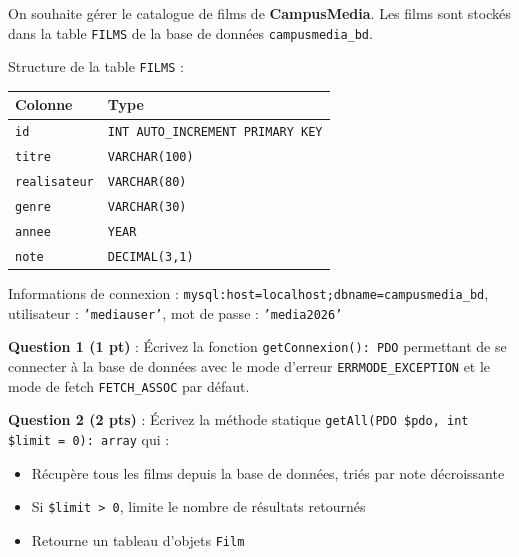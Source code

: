 \documentclass[11pt,a4paper]{article}
\newcommand{\answerbox}[1]{%
  \begin{mdframed}[
    linecolor=answerframe,
    linewidth=0.5pt,
    backgroundcolor=answerbg,
    innertopmargin=6pt,
    innerbottommargin=#1,
    innerleftmargin=6pt,
    innerrightmargin=6pt,
    skipabove=4pt,
    skipbelow=6pt,
  ]
  \phantom{x}
  \end{mdframed}
}
\begin{document}
\answerbox{80pt}

\newpage

\begin{mdframed}[style=exstyle, frametitle={Exercice 2 \quad PHP et PDO \hfill (6 pts)}]
On souhaite gérer le catalogue de films de \textbf{CampusMedia}.
Les films sont stockés dans la table \texttt{FILMS} de la base de données \texttt{campusmedia\_bd}.

\vspace{6pt}
\noindent Structure de la table \texttt{FILMS} :

\vspace{4pt}
\noindent
\begin{tabular}{|l|l|}
  \hline
  \rowcolor{uirblue!10}
  \textbf{Colonne} & \textbf{Type} \\
  \hline
  \texttt{id}          & \texttt{INT AUTO\_INCREMENT PRIMARY KEY} \\
  \texttt{titre}       & \texttt{VARCHAR(100)} \\
  \texttt{realisateur} & \texttt{VARCHAR(80)} \\
  \texttt{genre}       & \texttt{VARCHAR(30)} \\
  \texttt{annee}       & \texttt{YEAR} \\
  \texttt{note}        & \texttt{DECIMAL(3,1)} \\
  \hline
\end{tabular}

\vspace{6pt}
\noindent Informations de connexion : \texttt{mysql:host=localhost;dbname=campusmedia\_bd},
utilisateur : \texttt{'mediauser'}, mot de passe : \texttt{'media2026'}
\end{mdframed}

\bigskip

\noindent\textbf{Question 1 (1 pt)} : Écrivez la fonction \texttt{getConnexion(): PDO} permettant de se connecter à la base de données avec le mode d'erreur \texttt{ERRMODE\_EXCEPTION} et le mode de fetch \texttt{FETCH\_ASSOC} par défaut.

\answerbox{80pt}

\noindent\textbf{Question 2 (2 pts)} : Écrivez la méthode statique \texttt{getAll(PDO \$pdo, int \$limit = 0): array} qui :
\begin{itemize}[itemsep=1pt, topsep=2pt]
  \item Récupère tous les films depuis la base de données, triés par note décroissante
  \item Si \texttt{\$limit > 0}, limite le nombre de résultats retournés
  \item Retourne un tableau d'objets \texttt{Film}
\end{itemize}
\end{document}
